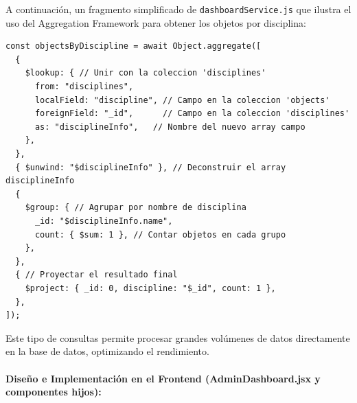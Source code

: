 A continuación, un fragmento simplificado de \texttt{dashboardService.js} que ilustra el uso del Aggregation Framework para obtener los objetos por disciplina:

\begin{lstlisting}[style=miJavaScript, caption=Ejemplo de agregación en \texttt{dashboardService.js} para \texttt{objectsByDiscipline}, label=lts:dashboardServiceAggregation]
const objectsByDiscipline = await Object.aggregate([
  {
    $lookup: { // Unir con la coleccion 'disciplines'
      from: "disciplines",
      localField: "discipline", // Campo en la coleccion 'objects'
      foreignField: "_id",      // Campo en la coleccion 'disciplines'
      as: "disciplineInfo",   // Nombre del nuevo array campo
    },
  },
  { $unwind: "$disciplineInfo" }, // Deconstruir el array disciplineInfo
  {
    $group: { // Agrupar por nombre de disciplina
      _id: "$disciplineInfo.name",
      count: { $sum: 1 }, // Contar objetos en cada grupo
    },
  },
  { // Proyectar el resultado final
    $project: { _id: 0, discipline: "$_id", count: 1 },
  },
]);
\end{lstlisting}
Este tipo de consultas permite procesar grandes volúmenes de datos directamente en la base de datos, optimizando el rendimiento.


\paragraph{Diseño e Implementación en el Frontend (\textbf{AdminDashboard.jsx} y componentes hijos):}


